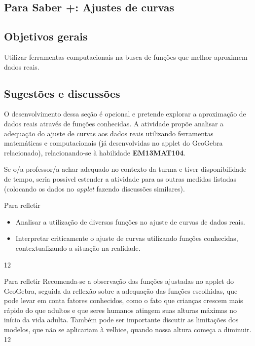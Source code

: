 \clearpage
\begin{texto}
{
\section{Para Saber +: Ajustes de curvas}
\subsection{Objetivos gerais}
Utilizar ferramentas computacionais na busca de funções que melhor aproximem dados reais.

\subsection{Sugestões e discussões}
O desenvolvimento dessa seção é opcional e pretende explorar a aproximação de dados reais através de funções conhecidas. A atividade propõe analisar a adequação do ajuste de curvas aos dados reais utilizando ferramentas matemáticas e computacionais (já desenvolvidas no applet do GeoGebra relacionado), relacionando-se à habilidade \textbf{EM13MAT104}.

Se o/a professor/a achar adequado no contexto da turma e tiver disponibilidade de tempo, seria possível estender a atividade para as outras medidas listadas (colocando os dados no \textit{applet} fazendo discussões similares).
}
\end{texto}
\clearmargin
\begin{objectives}{Para refletir}
{
	\begin{itemize}
	\item Analisar a utilização de diversas funções no ajuste de curvas de dados reais.
	\item Interpretar criticamente o ajuste de curvas utilizando funções conhecidas, contextualizando a situação na realidade.
	\end{itemize}
}{1}{2}
\end{objectives}
\begin{sugestions}{Para refletir}
{
	Recomenda-se a observação das funções ajustadas no applet do GeoGebra, seguida da reflexão sobre a adequação das funções escolhidas, que pode levar em conta fatores conhecidos, como o fato que crianças crescem mais rápido do que adultos e que seres humanos atingem suas alturas máximas no início da vida adulta. Também pode ser importante discutir as limitações dos modelos, que não se aplicariam à velhice, quando nossa altura começa a diminuir.
}{1}{2}
\end{sugestions}

